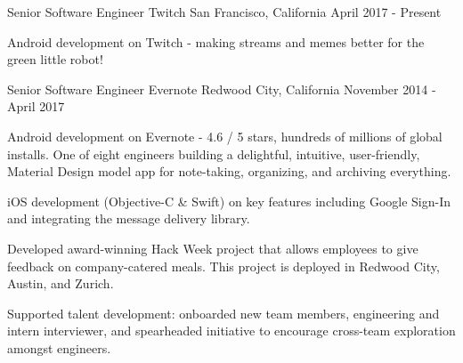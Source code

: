 

\begin{cventries}

  \cventry
    {Senior Software Engineer} %
    {Twitch} %
    {San Francisco, California} %
    {April 2017 - Present} %
    {
	\begin{cvitems} %
      	\item {Android development on Twitch - making streams and memes better for the green little robot!}
	\end{cvitems}
    }

  \cventry
    {Senior Software Engineer} %
    {Evernote} %
    {Redwood City, California} %
    {November 2014 - April 2017} %
    {
	\begin{cvitems} %
      	\item {Android development on Evernote - 4.6 / 5 stars, hundreds of millions of global installs. One of eight engineers building a delightful, intuitive, user-friendly, Material Design model app for note-taking, organizing, and archiving everything.}        
	\item {iOS development (Objective-C \& Swift) on key features including Google Sign-In and integrating the message delivery library.}
	\item {Developed award-winning Hack Week project that allows employees to give feedback on company-catered meals. This project is  deployed in Redwood City, Austin, and Zurich.}
	\item {Supported talent development: onboarded new team members, engineering and intern interviewer, and spearheaded initiative to encourage cross-team exploration amongst engineers.}
	\end{cvitems}
    }
    

\end{cventries}
